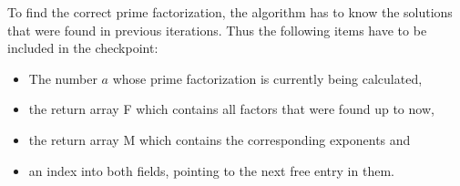 To find the correct prime factorization, the algorithm has to know the solutions that were found in previous iterations. Thus the following items have to be included in the checkpoint:
\begin{samepage}
\begin{itemize}
	\item The number $a$ whose prime factorization is currently being calculated,
	\item the return array F which contains all factors that were found up to now,
	\item the return array M which contains the corresponding exponents and
	\item an index into both fields, pointing to the next free entry in them.
\end{itemize}
\end{samepage}

